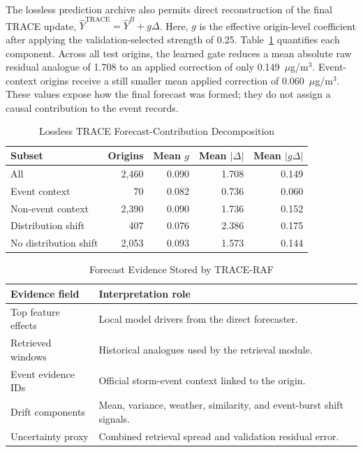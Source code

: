 \documentclass{ieeeaccess}
\begin{document}
The lossless prediction archive also permits direct reconstruction of the
final TRACE update, $\hat{Y}^{\mathrm{TRACE}}=\hat{Y}^{B}+g\Delta$. Here, $g$
is the effective origin-level coefficient after applying the
validation-selected strength of 0.25. Table~\ref{tab:trace_decomposition}
quantifies each component. Across all test origins, the learned gate reduces a
mean absolute raw residual analogue of 1.708 to an applied correction of only
0.149~$\mu$g/m$^3$. Event-context origins receive a still smaller mean applied
correction of 0.060~$\mu$g/m$^3$. These values expose how the final forecast was
formed; they do not assign a causal contribution to the event records.

\begin{table}[!t]
\centering
\caption{Lossless TRACE Forecast-Contribution Decomposition}
\label{tab:trace_decomposition}
\begin{tabular}{lrrrr}
\toprule
Subset & Origins & Mean $g$ & Mean $|\Delta|$ & Mean $|g\Delta|$ \\
\midrule
All & 2,460 & 0.090 & 1.708 & 0.149 \\
Event context & 70 & 0.082 & 0.736 & 0.060 \\
Non-event context & 2,390 & 0.090 & 1.736 & 0.152 \\
Distribution shift & 407 & 0.076 & 2.386 & 0.175 \\
No distribution shift & 2,053 & 0.093 & 1.573 & 0.144 \\
\bottomrule
\end{tabular}
\end{table}

\begin{table}[!t]
\centering
\caption{Forecast Evidence Stored by TRACE-RAF}
\label{tab:explainability_outputs}
\begin{tabular}{p{}p{}}
\toprule
Evidence field & Interpretation role \\
\midrule
Top feature effects & Local model drivers from the direct forecaster. \\
Retrieved windows & Historical analogues used by the retrieval module. \\
Event evidence IDs & Official storm-event context linked to the origin. \\
Drift components & Mean, variance, weather, similarity, and event-burst shift signals. \\
Uncertainty proxy & Combined retrieval spread and validation residual error. \\
\bottomrule
\end{tabular}
\end{table}
\end{document}
